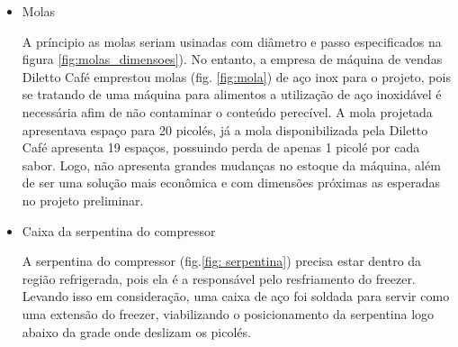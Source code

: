 \begin{itemize}
    
\item Molas

A príncipio as molas seriam usinadas com diâmetro e passo especificados na figura \ref{fig:molas_dimensoes}). No entanto, a empresa de máquina de vendas Diletto Café emprestou molas (fig. \ref{fig:mola}) de aço inox  para o projeto, pois se tratando de uma máquina para alimentos a utilização de aço inoxidável é necessária afim de não contaminar o conteúdo perecível. A mola projetada apresentava espaço para 20 picolés, já a mola disponibilizada pela Diletto Café apresenta 19 espaços, possuindo perda de apenas 1 picolé por cada sabor. Logo, não apresenta grandes mudanças no estoque da máquina, além de ser uma solução mais econômica e com dimensões próximas as esperadas no projeto preliminar. 





\item Caixa da serpentina do compressor

A serpentina do compressor (fig.\ref{fig: serpentina}) precisa estar dentro da região refrigerada, pois ela é a responsável pelo resfriamento do freezer. Levando isso em consideração, uma caixa de aço foi soldada para servir como uma extensão do freezer, viabilizando o posicionamento da serpentina logo abaixo da grade onde deslizam os picolés. 




\end{itemize}
